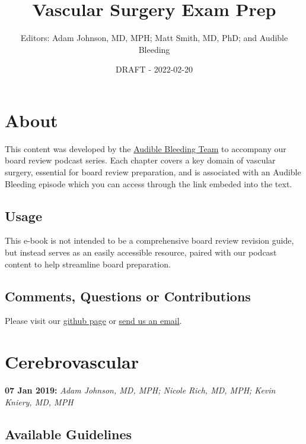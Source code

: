 \documentclass[
]{book}
\title{Vascular Surgery Exam Prep}
\author{Editors: Adam Johnson, MD, MPH; Matt Smith, MD, PhD; and Audible Bleeding}
\date{DRAFT - 2022-02-20}
\begin{document}
\maketitle

{
\setcounter{tocdepth}{1}
\tableofcontents
}
\hypertarget{about}{%
\chapter{About}\label{about}}

This content was developed by the \href{https://www.audiblebleeding.com/about-1/}{Audible Bleeding Team} to accompany our board review podcast series.
Each chapter covers a key domain of vascular surgery, essential for board review preparation, and is associated with an Audible Bleeding episode which you can access through the link embeded into the text.

\hypertarget{usage}{%
\section{Usage}\label{usage}}

This e-book is not intended to be a comprehensive board review revision guide, but instead serves as an easily accessible resource, paired with our podcast content to help streamline board preparation.

\hypertarget{comments-questions-or-contributions}{%
\section{Comments, Questions or Contributions}\label{comments-questions-or-contributions}}

Please visit our \href{https://github.com/adam-mdmph/VS-Board-Review}{github page} or \href{mailto:audiblebleeding@vascularsociety.org}{send us an email}.

\hypertarget{cerebrovascular}{%
\chapter{Cerebrovascular}\label{cerebrovascular}}

\textbf{07 Jan 2019:} \emph{Adam Johnson, MD, MPH; Nicole Rich, MD, MPH; Kevin
Kniery, MD, MPH}

\hypertarget{available-guidelines}{%
\section{Available Guidelines}\label{available-guidelines}}
\end{document}
